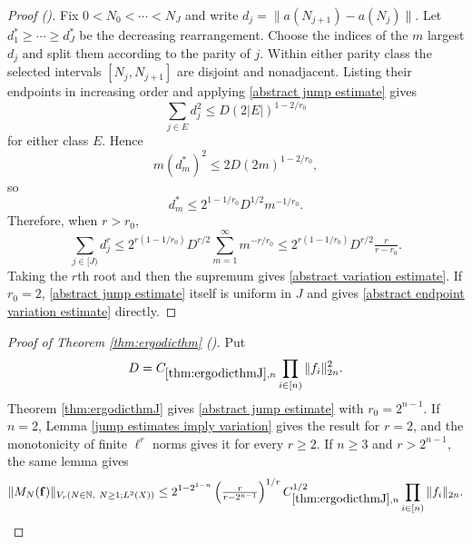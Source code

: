 \documentclass[12pt,reqno]{amsart}
\newcommand{\auto}{{({\tiny\faCar})}}
\theoremstyle{plain}
\numberwithin{equation}{section}
\theoremstyle{remark}
\newcommand{\N}{{\mathbb N}}
\begin{document}
\begin{proof}[Proof \auto]
Fix $0<N_0<\cdots<N_J$ and write $d_j=\|a(N_{j+1})-a(N_j)\|$. Let $d_1^*\ge\cdots\ge d_J^*$ be the decreasing rearrangement. Choose the indices of the $m$ largest $d_j$ and split them according to the parity of $j$. Within either parity class the selected intervals $[N_j,N_{j+1}]$ are disjoint and nonadjacent. Listing their endpoints in increasing order and applying \eqref{abstract jump estimate} gives
\[
\sum_{j\in E}d_j^2\le D(2|E|)^{1-2/r_0}
\]
for either class $E$. Hence
\[
m(d_m^*)^2\le 2D(2m)^{1-2/r_0},
\]
so
\[
d_m^*\le2^{1-1/r_0}D^{1/2}m^{-1/r_0}.
\]
Therefore, when $r>r_0$,
\[
\sum_{j\in[J)}d_j^r
\le2^{r(1-1/r_0)}D^{r/2}\sum_{m=1}^{\infty}m^{-r/r_0}
\le2^{r(1-1/r_0)}D^{r/2}\tfrac{r}{r-r_0}.
\]
Taking the $r$th root and then the supremum gives \eqref{abstract variation estimate}. If $r_0=2$, \eqref{abstract jump estimate} itself is uniform in $J$ and gives \eqref{abstract endpoint variation estimate} directly.
\end{proof}

\begin{proof}[Proof of Theorem \ref{thm:ergodicthm} \auto]
Put
\[
D=C_{\ref{thm:ergodicthmJ},n}\prod_{i\in[n)}\|f_i\|_{2n}^2.
\]
Theorem \ref{thm:ergodicthmJ} gives \eqref{abstract jump estimate} with $r_0=2^{n-1}$. If $n=2$, Lemma \ref{jump estimates imply variation} gives the result for $r=2$, and the monotonicity of finite $\ell^r$ norms gives it for every $r\ge2$. If $n\ge3$ and $r>2^{n-1}$, the same lemma gives
\[
\|M_N(\mathbf f)\|_{V_r(N\in\N,\ N\ge1;L^2(X))}
\le 2^{1-2^{1-n}}\left(\tfrac{r}{r-2^{n-1}}\right)^{1/r}
C_{\ref{thm:ergodicthmJ},n}^{1/2}
\prod_{i\in[n)}\|f_i\|_{2n}.
\]
\end{proof}
\end{document}

